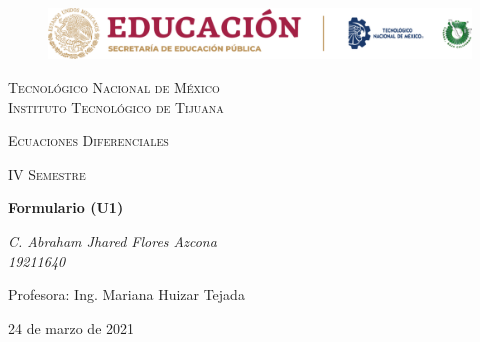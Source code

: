 \documentclass[letterpaper, 12pt]{article}
\begin{document}
    
    \begin{titlepage}
        \begin{figure}[ht]
            \centering
            \includegraphics[width=15cm]{logosITT.png}
        \end{figure}
        \centering
        {\scshape\LARGE Tecnológico Nacional de México\\Instituto Tecnológico de Tijuana\par}
        \vspace{1cm}
        {\scshape\Large Ecuaciones Diferenciales\par}
        \vspace{1cm}
        {\scshape\Large IV Semestre\par}
        \vspace{1.5cm}
        {\huge\bfseries Formulario (U1)\par}
        \vspace{2cm}
        {\Large\itshape C. Abraham Jhared Flores Azcona\\19211640\par}
        \vfill
        Profesora: Ing. Mariana Huizar Tejada\par
        
        \vfill

        {\large 24 de marzo de 2021}
    \end{titlepage}
\end{document}
